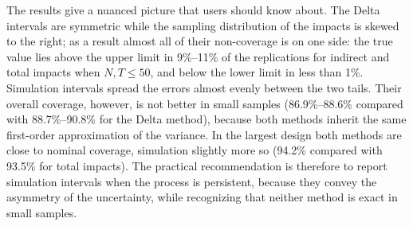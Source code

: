 \begin{table}[t!]
\centering\scriptsize

\caption{Long-run impacts of $x_1$ with $\psi_0=0.35$, $\rho_1=0.5$:
coverage (\%) of nominal 95\% intervals, frequency (\%) with which the true
value lies below the lower or above the upper limit, and median width.}
\label{tab:mc2}
\end{table}

The results give a nuanced picture that users should know about. The Delta
intervals are symmetric while the sampling distribution of the impacts is
skewed to the right; as a result almost all of their non-coverage is on one
side: the true value lies above the upper limit in 9\%--11\% of the
replications for indirect and total impacts when $N,T\le 50$, and below the
lower limit in less than 1\%. Simulation intervals spread the errors almost
evenly between the two tails. Their overall coverage, however, is not
better in small samples (86.9\%--88.6\% compared with 88.7\%--90.8\% for the Delta
method), because both methods inherit the same first-order approximation of
the variance. In the largest design both methods are close to nominal
coverage, simulation slightly more so (94.2\% compared with 93.5\% for total
impacts). The practical recommendation is therefore to report simulation
intervals when the process is persistent, because they convey the
asymmetry of the uncertainty, while recognizing that neither method is
exact in small samples.


